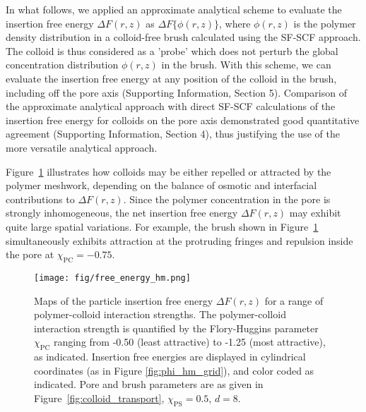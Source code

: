 \documentclass[12pt, a4paper]{article}
\begin{document}

In what follows, we applied an approximate analytical scheme to evaluate the insertion free energy $\Delta F(r,z)$ as $\Delta F\{\phi(r,z)\}$, where $\phi(r,z)$ is the polymer density distribution in a colloid-free brush calculated using the SF-SCF approach.
The colloid is thus considered as a 'probe' which does not perturb the global concentration distribution $\phi(r,z)$ in the brush.
With this scheme, we can evaluate the insertion free energy at any position of the colloid in the brush, including off the pore axis (Supporting Information, Section 5).
Comparison of the approximate analytical approach with direct SF-SCF calculations of the insertion free energy for colloids on the pore axis demonstrated good quantitative agreement (Supporting Information, Section 4), thus justifying the use of the more versatile analytical approach.

Figure~\ref{fig:DeltaF_map} illustrates how colloids may be either repelled or attracted by the polymer meshwork, depending on the balance of osmotic and interfacial contributions to $\Delta F(r,z)$.
Since the polymer concentration in the pore is strongly inhomogeneous, the net insertion free energy $\Delta F(r,z)$ may exhibit quite large spatial variations.
For example, the brush shown in Figure~\ref{fig:DeltaF_map} simultaneously exhibits attraction at the protruding fringes and repulsion inside the pore at $\chi_{\text{PC}}=-0.75$.

\begin{figure}
    \centering
    \texttt{[image: fig/free\_energy\_hm.png]}
    \caption{
    Maps of the particle insertion free energy $\Delta F(r,z)$ for a range of polymer-colloid interaction strengths.
    The polymer-colloid interaction strength is quantified by the Flory-Huggins parameter $\chi_{\text{PC}}$ ranging from -0.50 (least attractive) to -1.25 (most attractive), as indicated.
    Insertion free energies are displayed in cylindrical coordinates (as in Figure \ref{fig:phi_hm_grid}), and color coded as indicated.
    Pore and brush parameters are as given in Figure~\ref{fig:colloid_transport}, $\chi_{\text{PS}}=0.5$, $d=8$.
    }
    \label{fig:DeltaF_map}
\end{figure}
\end{document}
